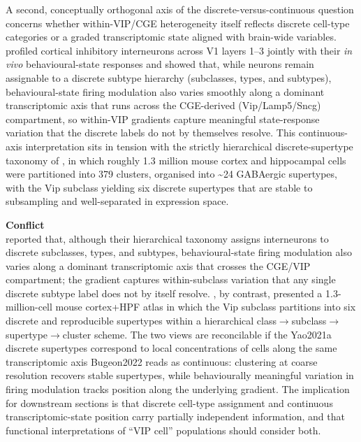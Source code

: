 \documentclass[11pt]{article}
\let\origrightarrow\rightarrow
\def\rightarrow{\ensuremath{\origrightarrow}}
\begin{document}
A second, conceptually orthogonal axis of the discrete-versus-continuous question concerns whether within-VIP/CGE heterogeneity itself reflects discrete cell-type categories or a graded transcriptomic state aligned with brain-wide variables. \citet{Bugeon2022} profiled cortical inhibitory interneurons across V1 layers 1--3 jointly with their \textit{in vivo} behavioural-state responses and showed that, while neurons remain assignable to a discrete subtype hierarchy (subclasses, types, and subtypes), behavioural-state firing modulation also varies smoothly along a dominant transcriptomic axis that runs across the CGE-derived (Vip/Lamp5/Sncg) compartment, so within-VIP gradients capture meaningful state-response variation that the discrete labels do not by themselves resolve. This continuous-axis interpretation sits in tension with the strictly hierarchical discrete-supertype taxonomy of \citet{Yao2021a}, in which roughly 1.3 million mouse cortex and hippocampal cells were partitioned into 379 clusters, organised into {\textasciitilde}24 GABAergic supertypes, with the Vip subclass yielding six discrete supertypes that are stable to subsampling and well-separated in expression space.

\begin{framed}
\textbf{Conflict}\\
\citet{Bugeon2022} reported that, although their hierarchical taxonomy assigns interneurons to discrete subclasses, types, and subtypes, behavioural-state firing modulation also varies along a dominant transcriptomic axis that crosses the CGE/VIP compartment; the gradient captures within-subclass variation that any single discrete subtype label does not by itself resolve. \citet{Yao2021a}, by contrast, presented a 1.3-million-cell mouse cortex+HPF atlas in which the Vip subclass partitions into six discrete and reproducible supertypes within a hierarchical class\rightarrow subclass\rightarrow supertype\rightarrow cluster scheme. The two views are reconcilable if the Yao2021a discrete supertypes correspond to local concentrations of cells along the same transcriptomic axis Bugeon2022 reads as continuous: clustering at coarse resolution recovers stable supertypes, while behaviourally meaningful variation in firing modulation tracks position along the underlying gradient. The implication for downstream sections is that discrete cell-type assignment and continuous transcriptomic-state position carry partially independent information, and that functional interpretations of ``VIP cell'' populations should consider both.
\end{framed}
\end{document}
